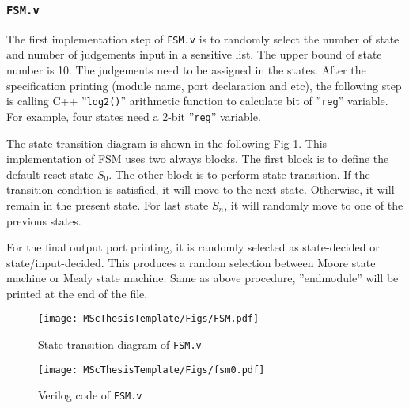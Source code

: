 \subsubsection{\texttt{FSM.v}}
The first implementation step of \texttt{FSM.v} is to randomly select the number of state and number of judgements input in a sensitive list. The upper bound of state number is 10. The judgements need to be assigned in the states.  After the specification printing (module name, port declaration and etc), the following step is calling C++ ''\texttt{log2()}'' arithmetic function to calculate bit of ''\texttt{reg}'' variable. For example, four states need a 2-bit ''\texttt{reg}'' variable.

The state transition diagram is shown in the following Fig \ref{fig:fsm}. This implementation of FSM uses two always blocks. The first block is to define the default reset state $S_{0}$. The other block is to perform state transition. If the transition condition is satisfied, it will move to the next state. Otherwise, it will remain in the present state. For last state $S_{n}$, it will randomly move to one of the previous states.

For the final output port printing, it is randomly selected as state-decided or state/input-decided. This produces a random selection between Moore state machine or Mealy state machine. Same as above procedure, ''endmodule'' will be printed at the end of the file.

\begin{figure}[htb]
    \centering
    \texttt{[image: MScThesisTemplate/Figs/FSM.pdf]}
    \caption{\footnotesize State transition diagram of \texttt{FSM.v} }
    \label{fig:fsm}
\end{figure}
\begin{figure}[htbp]
    \centering
    \texttt{[image: MScThesisTemplate/Figs/fsm0.pdf]}
    \caption{\footnotesize Verilog code of \texttt{FSM.v}}
\end{figure}
